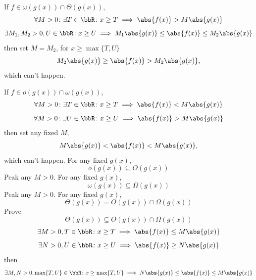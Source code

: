 \documentclass[a4paper,12pt]{report}
\begin{document}
\begin{itemize}
\begin{itemize}
If $f\in \omega(g(x))\cap\Theta(g(x))$,
\[\forall M>0\colon\exists T\in\bbR\colon x\ge T\implies\abs{f(x)}>M\abs{g(x)}\]
\[\exists M_1,M_2>0,U\in\bbR\colon x\ge U\implies M_1\abs{g(x)}\le\abs{f(x)}\le M_2\abs{g(x)}\]
then set $M=M_2$, for $x\ge\max\{T,U\}$
\[M_2\abs{g(x)}\ge\abs{f(x)}>M_2\abs{g(x)},\]
which can't happen.

If $f\in o(g(x))\cap\omega(g(x))$,
\[\forall M>0\colon\exists T\in\bbR\colon x\ge T\implies\abs{f(x)}<M\abs{g(x)}\]
\[\forall M>0\colon\exists U\in\bbR\colon x\ge U\implies\abs{f(x)}>M\abs{g(x)}\]
then set any fixed $M$,
\[M\abs{g(x)}<\abs{f(x)}<M\abs{g(x)},\]
which can't happen.
\epr
For any fixed $g(x)$,
\[o(g(x))\subseteq O(g(x))\]
\bpr
Peak any $M>0$.
\epr
For any fixed $g(x)$,
\[\omega(g(x))\subseteq\Omega(g(x))\]
\bpr
Peak any $M>0$.
\epr
For any fixed $g(x)$,
\[\Theta(g(x))=O(g(x))\cap\Omega(g(x))\]
\bpr
Prove
\[\Theta(g(x))\subseteq O(g(x))\cap\Omega(g(x))\]
\[\exists M>0,T\in\bbR\colon x\ge T\implies\abs{f(x)}\le M\abs{g(x)}\]
\[\exists N>0,U\in\bbR\colon x\ge U\implies\abs{f(x)}\ge N\abs{g(x)}\]
then
\[\exists M,N>0,\max\{T,U\}\in\bbR\colon x\ge \max\{T,U\}\implies N\abs{g(x)}\le\abs{f(x)}\le M\abs{g(x)}\]


\end{itemize}
\end{itemize}
\end{document}
